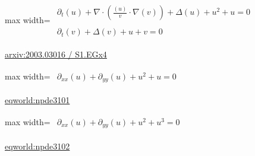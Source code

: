 \documentclass[10pt,a4paper]{article}
\begin{document}
\begin{minipage}{\linewidth}
\begin{center}\begin{adjustbox}{max width=\linewidth}$\displaystyle\begin{gathered}\begin{gathered}\partial_{t}(u)+\nabla\cdot(\frac{(u)}{v}\cdot \nabla(v))+\Delta(u)+u^{2}+u=0\end{gathered}\\[5pt]\begin{gathered}\partial_{t}(v)+\Delta(v)+u+v=0\end{gathered}\end{gathered}$\end{adjustbox}\end{center}
{\small \href{https://arxiv.org/html/2003.03016#S1.EGx4}{arxiv:2003.03016 / S1.EGx4}}\par
\end{minipage}\par\vspace{7mm}

\begin{minipage}{\linewidth}
\begin{center}\begin{adjustbox}{max width=\linewidth}$\displaystyle\begin{gathered}\begin{gathered}\partial_{xx}(u)+\partial_{yy}(u)+u^{2}+u=0\end{gathered}\end{gathered}$\end{adjustbox}\end{center}
{\small \href{https://eqworld.ipmnet.ru/en/solutions/npde/npde3101.pdf}{eqworld:npde3101}}\par
\end{minipage}\par\vspace{7mm}

\begin{minipage}{\linewidth}
\begin{center}\begin{adjustbox}{max width=\linewidth}$\displaystyle\begin{gathered}\begin{gathered}\partial_{xx}(u)+\partial_{yy}(u)+u^{2}+u^{3}=0\end{gathered}\end{gathered}$\end{adjustbox}\end{center}
{\small \href{https://eqworld.ipmnet.ru/en/solutions/npde/npde3102.pdf}{eqworld:npde3102}}\par
\end{minipage}\par\vspace{7mm}
\end{document}
